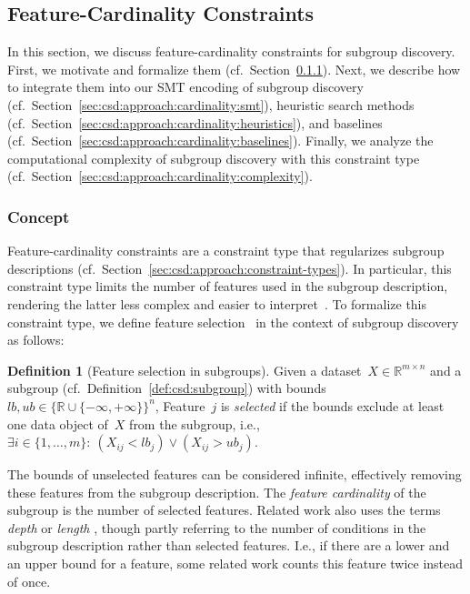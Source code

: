 \documentclass{article}
\theoremstyle{definition}
\newtheorem{definition}{Definition}
\begin{document}
\subsection{Feature-Cardinality Constraints}
\label{sec:csd:approach:cardinality}

In this section, we discuss feature-cardinality constraints for subgroup discovery.
First, we motivate and formalize them (cf.~Section~\ref{sec:csd:approach:cardinality:concept}).
Next, we describe how to integrate them into our SMT encoding of subgroup discovery (cf.~Section~\ref{sec:csd:approach:cardinality:smt}), heuristic search methods (cf.~Section~\ref{sec:csd:approach:cardinality:heuristics}), and baselines (cf.~Section~\ref{sec:csd:approach:cardinality:baselines}).
Finally, we analyze the computational complexity of subgroup discovery with this constraint type (cf.~Section~\ref{sec:csd:approach:cardinality:complexity}).

\subsubsection{Concept}
\label{sec:csd:approach:cardinality:concept}

Feature-cardinality constraints are a constraint type that regularizes subgroup descriptions (cf.~Section~\ref{sec:csd:approach:constraint-types}).
In particular, this constraint type limits the number of features used in the subgroup description, rendering the latter less complex and easier to interpret~\cite{meeng2021real}.
To formalize this constraint type, we define feature selection~\cite{guyon2003introduction, li2017feature} in the context of subgroup discovery as follows:
%
\begin{definition}[Feature selection in subgroups]
	Given a dataset~$X \in \mathbb{R}^{m \times n}$ and a subgroup (cf.~Definition~\ref{def:csd:subgroup}) with bounds~$\mathit{lb}, \mathit{ub} \in \{\mathbb{R} \cup \{-\infty, +\infty\}\}^n$,
	Feature~$j$ is \emph{selected} if the bounds exclude at least one data object of~$X$ from the subgroup, i.e., $\exists i \in \{1, \dots, m\}:~ \left( X_{ij} < \mathit{lb}_j \right) \lor \left( X_{ij} > \mathit{ub}_j \right)$.
	\label{def:csd:feature-selection}
\end{definition}
%
The bounds of unselected features can be considered infinite, effectively removing these features from the subgroup description.
The \emph{feature cardinality} of the subgroup is the number of selected features.
Related work also uses the terms \emph{depth} \cite{meeng2021real} or \emph{length} \cite{atzmueller2015subgroup, helal2016subgroup}, though partly referring to the number of conditions in the subgroup description rather than selected features.
I.e., if there are a lower and an upper bound for a feature, some related work counts this feature twice instead of once.
\end{document}
